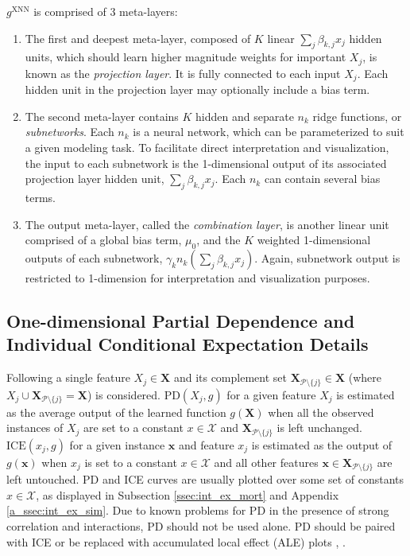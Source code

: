 \documentclass[information,article,submit,moreauthors,pdftex]{definitions/mdpi}
\begin{document}
\noindent $g^{\text{XNN}}$ is comprised of 3 meta-layers:

\begin{enumerate}[leftmargin=*,labelsep=4.9mm]
	\item The first and deepest meta-layer, composed of $K$ linear $\sum_j\beta_{k,j}x_j$ hidden units, which should learn higher magnitude weights for important $X_j$, is known as the \textit{projection layer}. It is fully connected to each input $X_j$. Each hidden unit in the projection layer may optionally include a bias term.
	\item The second meta-layer contains $K$ hidden and separate $n_k$ ridge functions, or \textit{subnetworks}. Each $n_k$ is a neural network, which can be parameterized to suit a given modeling task. To facilitate direct interpretation and visualization, the input to each subnetwork is the 1-dimensional output of its associated projection layer hidden unit, $\sum_j\beta_{k,j}x_j$. Each $n_k$ can contain several bias terms.
	\item The output meta-layer, called the \textit{combination layer}, is another linear unit comprised of a global bias term, $\mu_0$, and the $K$ weighted 1-dimensional outputs of each subnetwork, $\gamma_kn_k(\sum_j\beta_{k,j}x_j)$. Again, subnetwork output is restricted to 1-dimension for interpretation and visualization purposes.
\end{enumerate}

\subsection{One-dimensional Partial Dependence and Individual Conditional Expectation Details}\label{a_ssec:pd_ice}

Following \citet{esl} a single feature $X_j \in \mathbf{X}$ and its complement set $\mathbf{X}_{\mathcal{P} \setminus \{j\}} \in \mathbf{X}$ (where $X_j \cup \mathbf{X}_{\mathcal{P} \setminus \{j\}} = \mathbf{X}$) is considered. $\text{PD}(X_j, g)$ for a given feature $X_j$ is estimated as the average output of the learned function $g(\mathbf{X})$ when all the observed instances of $X_j$ are set to a constant $x \in \mathcal{X}$ and $\mathbf{X}_{\mathcal{P} \setminus \{j\}}$ is left unchanged. $\text{ICE}(x_j, g)$ for a given instance $\mathbf{x}$ and feature $x_j$ is estimated as the output of $g(\mathbf{x})$ when $x_j$ is set to a constant $x \in \mathcal{X}$ and all other features $\mathbf{x} \in \mathbf{X}_{\mathcal{P} \setminus \{j\}}$ are left untouched. PD and ICE curves are usually plotted over some set of constants $x \in \mathcal{X}$, as displayed in Subsection \ref{ssec:int_ex_mort} and Appendix \ref{a_ssec:int_ex_sim}. Due to known problems for PD in the presence of strong correlation and interactions, PD should not be used alone. PD should be paired with ICE or be replaced with accumulated local effect (ALE) plots \cite{ice_plots}, \cite{ale_plot}.
\end{document}
